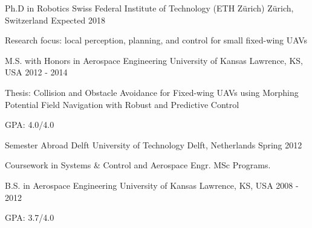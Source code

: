 \vspace{2mm}

\begin{cventries}

  \cvleftentry
    {Ph.D in Robotics} %
    {Swiss Federal Institute of Technology (ETH Z\"{u}rich)} %
    {Z\"{u}rich, Switzerland} %
    {Expected 2018} %
    {
      \begin{cvleftitems} %
        \item {Research focus: local perception, planning, and control for small fixed-wing UAVs}
      \end{cvleftitems}
    }
    
  \cvleftentry
	{M.S. with Honors in Aerospace Engineering} %
    {University of Kansas} %
    {Lawrence, KS, USA} %
    {2012 - 2014} %
    {
      \begin{cvleftitems} %
		\item {Thesis: Collision and Obstacle Avoidance for Fixed-wing UAVs using Morphing Potential Field Navigation with Robust and Predictive Control}
        \item {GPA: 4.0/4.0}
      \end{cvleftitems}
    }
    
  \cvleftentry
    {Semester Abroad} %
    {Delft University of Technology} %
    {Delft, Netherlands} %
    {Spring 2012} %
    {
      \begin{cvleftitems} %
        \item {Coursework in Systems \& Control and Aerospace Engr. MSc Programs.}
      \end{cvleftitems}
    }
    
  \cvleftentry
    {B.S. in Aerospace Engineering} %
    {University of Kansas} %
    {Lawrence, KS, USA} %
    {2008 - 2012} %
    {
      \begin{cvleftitems} %
        \item {GPA: 3.7/4.0}
      \end{cvleftitems}
    }
\end{cventries}
